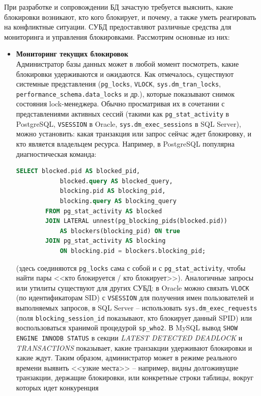  При разработке и сопровождении БД зачастую требуется выяснить, какие блокировки возникают, кто кого блокирует, и почему, а также уметь реагировать на конфликтные ситуации. СУБД предоставляют различные средства для мониторинга и управления блокировками. Рассмотрим основные из них: 
 \begin{itemize}
    \item \textbf{Мониторинг текущих блокировок} ~\\
   Администратор базы данных может в любой момент посмотреть, какие блокировки удерживаются и ожидаются. Как отмечалось, существуют системные представления (\texttt{pg\_locks}, \texttt{V\textdollar LOCK}, \texttt{sys.dm\_tran\_locks}, \texttt{performance\_schema.data\_locks} и др.), которые показывают снимок состояния lock-менеджера. Обычно просматривая их в сочетании с представлениями активных сессий (такими как \texttt{pg\_stat\_activity} в PostgreSQL, \texttt{V\textdollar SESSION} в Oracle, \texttt{sys.dm\_exec\_sessions} в SQL Server), можно установить: какая транзакция или запрос сейчас ждет блокировку, и кто является владельцем ресурса. Например, в PostgreSQL популярна диагностическая команда:
    \begin{lstlisting}[language=SQL]
        SELECT blocked.pid AS blocked_pid,
            blocked.query AS blocked_query,
            blocking.pid AS blocking_pid,
            blocking.query AS blocking_query
        FROM pg_stat_activity AS blocked
        JOIN LATERAL unnest(pg_blocking_pids(blocked.pid))
            AS blockers(blocking_pid) ON true
        JOIN pg_stat_activity AS blocking
            ON blocking.pid = blockers.blocking_pid;
    \end{lstlisting}

    (здесь соединяются \texttt{pg\_locks} сама с собой и с \texttt{pg\_stat\_activity}, чтобы найти пары <<кто блокируется / кто блокирует>>). Аналогичные запросы или утилиты существуют для других СУБД: в Oracle можно связать \texttt{V\textdollar LOCK} (по идентификаторам SID) с \texttt{V\textdollar SESSION} для получения имен пользователей и выполняемых запросов, в SQL Server – использовать \texttt{sys.dm\_exec\_requests} (поля \texttt{blocking\_session\_id} показывают, кто блокирует данный SPID) или воспользоваться хранимой процедурой \texttt{sp\_who2}. В MySQL вывод \texttt{SHOW ENGINE INNODB STATUS} в секции \textit{LATEST DETECTED DEADLOCK} и \textit{TRANSACTIONS} показывает, какие транзакции удерживают блокировки и какие ждут. Таким образом, администратор может в режиме реального времени выявить <<узкие места>> – например, видны долгоживущие транзакции, держащие блокировки, или конкретные строки таблицы, вокруг которых идет конкуренция
    

\end{itemize}
